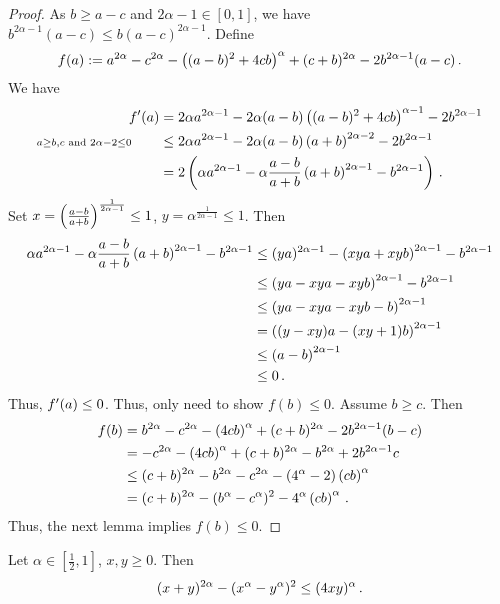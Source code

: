 \begin{proof}
	As $b\geq a-c$ and $2\alpha-1 \in[0,1]$, we have $b^{2\alpha-1} (a-c) \leq b (a-c)^{2\alpha-1}$.
	Define
	\begin{equation*}
		f(a) := a^{2\alpha}-c^{2\alpha}-\left( (a-b)^2+4cb \right)^{\alpha}+(c+b)^{2\alpha}  -2 b^{2\alpha-1} (a-c)
		\, .
	\end{equation*}
	We have
	\begin{align*}
		f^\prime(a) &= 	2\alpha a^{2\alpha-1}-2\alpha (a-b)\left( (a-b)^2+4cb \right)^{\alpha-1}-2 b^{2\alpha-1}
		\\ {\scriptstyle a \geq b,c \text{ and } 2\alpha-2\leq 0} \qquad&\leq
		2\alpha a^{2\alpha-1}-2\alpha (a-b)\left( a+b \right)^{2\alpha-2}-2 b^{2\alpha-1}
		\\&=
		2\left( \alpha a^{2\alpha-1}- \alpha \frac{a-b}{a+b}\left( a+b \right)^{2\alpha-1} - b^{2\alpha-1} \right)
		\, .
	\end{align*}
	Set $x = \left( \frac{a-b}{a+b} \right)^{\frac{1}{2\alpha-1}} \leq 1$, $y = \alpha^{\frac{1}{2\alpha-1}} \leq 1$.
	Then 
	\begin{align*}
		\alpha a^{2\alpha-1}- \alpha \frac{a-b}{a+b}\left( a+b \right)^{2\alpha-1} - b^{2\alpha-1}
		&\leq
		(ya)^{2\alpha-1}- \left( xya+xyb \right)^{2\alpha-1} - b^{2\alpha-1}
		\\&\leq
		\left( ya-xya-xyb \right)^{2\alpha-1} - b^{2\alpha-1}
		\\&\leq
		\left( ya-xya-xyb-b \right)^{2\alpha-1}
		\\&=
		\left( (y-xy)a-(xy+1)b \right)^{2\alpha-1}
		\\&\leq
		\left( a-b \right)^{2\alpha-1}
		\\&\leq
		0\, .
	\end{align*}
	Thus, $f^\prime(a) \leq 0$. Thus, only need to show $f(b) \leq 0$.
	Assume $b \geq c$. Then
	\begin{align*}
		f(b) 
		&= 
		b^{2\alpha}-c^{2\alpha}-\left( 4cb \right)^{\alpha}+(c+b)^{2\alpha}  -2 b^{2\alpha-1} (b-c)
		\\&=
		-c^{2\alpha}-\left( 4cb \right)^{\alpha}+(c+b)^{2\alpha}  - b^{2\alpha}+2 b^{2\alpha-1} c
		\\&\leq
		(c+b)^{2\alpha}- b^{2\alpha}-c^{2\alpha}-\left( 4^\alpha-2 \right)\left( cb \right)^{\alpha}
		\\&= 
		(c+b)^{2\alpha}-(b^\alpha-c^\alpha)^2-4^\alpha\left( cb \right)^{\alpha}
		\, .
	\end{align*}
	Thus, the next lemma implies $f(b) \leq 0$.
\end{proof}
%
\begin{lemma}\label{lmm:alpha_binom}
	Let $\alpha\in[\frac12,1]$, $x,y\geq0$.
	Then 
	\begin{equation*}
		(x+y)^{2\alpha}-(x^\alpha-y^\alpha)^2 \leq (4xy)^\alpha
		\, .
	\end{equation*}
\end{lemma}
